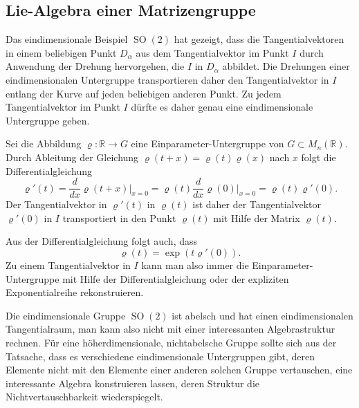 %
%
\subsection{Lie-Algebra einer Matrizengruppe}
Das eindimensionale Beispiel $\operatorname{SO}(2)$ hat gezeigt, dass
die Tangentialvektoren in einem beliebigen Punkt $D_\alpha$ aus dem
Tangentialvektor im Punkt $I$ durch Anwendung der Drehung hervorgehen,
die $I$ in $D_\alpha$ abbildet.
Die Drehungen einer eindimensionalen Untergruppe transportieren daher
den Tangentialvektor in $I$ entlang der Kurve auf jeden beliebigen
anderen Punkt.
Zu jedem Tangentialvektor im Punkt $I$ dürfte es daher genau eine
eindimensionale Untergruppe geben.

Sei die Abbildung $\varrho\colon\mathbb{R}\to G$ eine Einparameter-Untergruppe
von $G\subset M_n(\mathbb{R})$.
Durch Ableitung der Gleichung $\varrho(t+x) = \varrho(t)\varrho(x)$ nach
$x$ folgt die Differentialgleichung
\[
\varrho'(t)
=
\frac{d}{dx}\varrho(t+x)\bigg|_{x=0}
=
\varrho(t) \frac{d}{dx}\varrho(0)\bigg|_{x=0}
=
\varrho(t) \varrho'(0).
\]
Der Tangentialvektor in $\varrho'(t)$ in $\varrho(t)$ ist daher
der Tangentialvektor $\varrho'(0)$ in $I$ transportiert in den Punkt
$\varrho(t)$ mit Hilfe der Matrix $\varrho(t)$.

Aus der Differentialgleichung folgt auch, dass
\[
\varrho(t) = \exp (t\varrho'(0)).
\]
Zu einem Tangentialvektor in $I$ kann man also immer die
Einparameter-Untergruppe mit Hilfe der Differentialgleichung 
oder der expliziten Exponentialreihe rekonstruieren.

Die eindimensionale Gruppe $\operatorname{SO}(2)$ ist abelsch und
hat einen eindimensionalen Tangentialraum, man kann also nicht mit
einer interessanten Algebrastruktur rechnen.
Für eine höherdimensionale, nichtabelsche Gruppe sollte sich aus
der Tatsache, dass es verschiedene eindimensionale Untergruppen gibt,
deren Elemente nicht mit den Elemente einer anderen solchen Gruppe
vertauschen, eine interessante Algebra konstruieren lassen, deren
Struktur die Nichtvertauschbarkeit wiederspiegelt.

